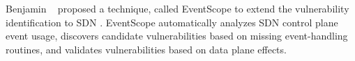 Benjamin \etal~\cite{inproceedings} proposed a technique, called EventScope to
extend the vulnerability identification to SDN \cite{6994333}. EventScope
automatically analyzes SDN control plane event usage, discovers candidate
vulnerabilities based on missing event-handling routines, and validates
vulnerabilities based on data plane effects.

